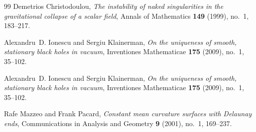 \documentclass[12pt]{article}
\theoremstyle{plain}
\theoremstyle{definition}
\theoremstyle{remark}
\begin{document}
\begin{thebibliography}{99}
Demetrios Christodoulou, \emph{The instability of naked singularities in the gravitational collapse of a scalar field}, Annals of Mathematics \textbf{149} (1999), no.~1, 183--217.

Alexandru~D. Ionescu and Sergiu Klainerman, \emph{On the uniqueness of smooth, stationary black holes in vacuum}, Inventiones Mathematicae \textbf{175} (2009), no.~1, 35--102.

Alexandru~D. Ionescu and Sergiu Klainerman, \emph{On the uniqueness of smooth, stationary black holes in vacuum}, Inventiones Mathematicae \textbf{175} (2009), no.~1, 35--102.

Rafe Mazzeo and Frank Pacard, \emph{Constant mean curvature surfaces with Delaunay ends}, Communications in Analysis and Geometry \textbf{9} (2001), no.~1, 169--237.

\end{thebibliography}
\end{document}
